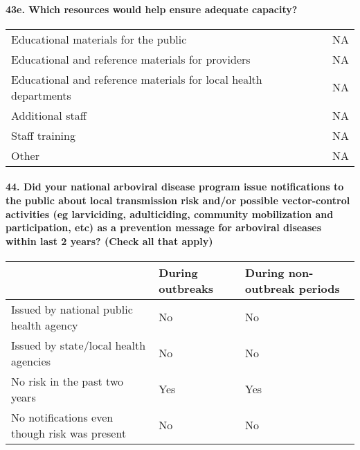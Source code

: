 \documentclass[
]{article}
\begin{document}
\begin{quote}
\end{quote}

\hypertarget{e.-which-resources-would-help-ensure-adequate-capacity}{%
\paragraph{43e. Which resources would help ensure adequate
capacity?}\label{e.-which-resources-would-help-ensure-adequate-capacity}}

\begin{longtable}[]{@{}ll@{}}
\toprule
\endhead
Educational materials for the public & NA \\
Educational and reference materials for providers & NA \\
Educational and reference materials for local health departments & NA \\
Additional staff & NA \\
Staff training & NA \\
Other & NA \\
\bottomrule
\end{longtable}

\hypertarget{did-your-national-arboviral-disease-program-issue-notifications-to-the-public-about-local-transmission-risk-andor-possible-vector-control-activities-eg-larviciding-adulticiding-community-mobilization-and-participation-etc-as-a-prevention-message-for-arboviral-diseases-within-last-2-years-check-all-that-apply}{%
\paragraph{44. Did your national arboviral disease program issue
notifications to the public about local transmission risk and/or
possible vector-control activities (eg larviciding, adulticiding,
community mobilization and participation, etc) as a prevention message
for arboviral diseases within last 2 years? (Check all that
apply)}\label{did-your-national-arboviral-disease-program-issue-notifications-to-the-public-about-local-transmission-risk-andor-possible-vector-control-activities-eg-larviciding-adulticiding-community-mobilization-and-participation-etc-as-a-prevention-message-for-arboviral-diseases-within-last-2-years-check-all-that-apply}}

\begin{longtable}[]{@{}lll@{}}
\toprule
& During outbreaks & During non-outbreak periods \\
\midrule
\endhead
Issued by national public health agency & No & No \\
Issued by state/local health agencies & No & No \\
No risk in the past two years & Yes & Yes \\
No notifications even though risk was present & No & No \\
\bottomrule
\end{longtable}
\end{document}
